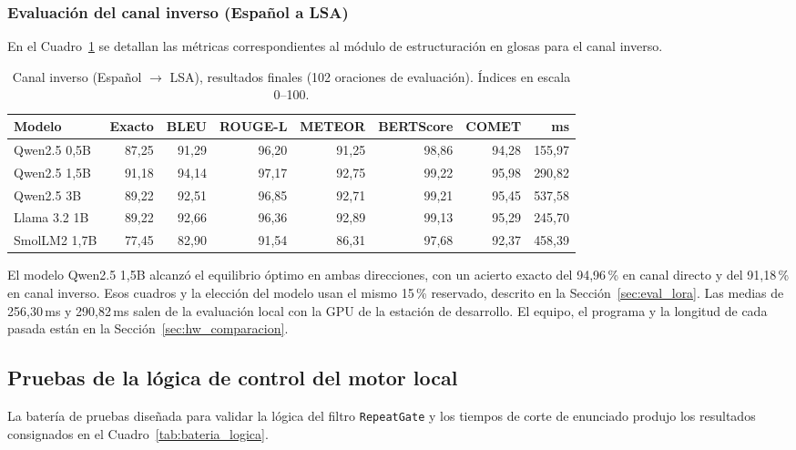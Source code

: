 \subsubsection{Evaluación del canal inverso (Español a LSA)}
En el Cuadro~\ref{tab:sem_inverso} se detallan las métricas correspondientes al módulo de estructuración en glosas para el canal inverso.

\begin{table}[H]
\centering
\footnotesize
\setlength{\tabcolsep}{3.5pt}
\caption{Canal inverso (Español $\rightarrow$ LSA), resultados finales (102 oraciones de evaluación). Índices en escala 0--100.}
\label{tab:sem_inverso}
\begin{tabular}{@{}lrrrrrrr@{}}
\toprule
\textbf{Modelo} & \textbf{Exacto} & \textbf{BLEU} & \textbf{ROUGE-L} & \textbf{METEOR} & \textbf{BERTScore} & \textbf{COMET} & \textbf{ms} \\
\midrule
Qwen2.5 0,5B & 87,25 & 91,29 & 96,20 & 91,25 & 98,86 & 94,28 & 155,97 \\
Qwen2.5 1,5B & 91,18 & 94,14 & 97,17 & 92,75 & 99,22 & 95,98 & 290,82 \\
Qwen2.5 3B   & 89,22 & 92,51 & 96,85 & 92,71 & 99,21 & 95,45 & 537,58 \\
Llama 3.2 1B & 89,22 & 92,66 & 96,36 & 92,89 & 99,13 & 95,29 & 245,70 \\
SmolLM2 1,7B & 77,45 & 82,90 & 91,54 & 86,31 & 97,68 & 92,37 & 458,39 \\
\bottomrule
\end{tabular}
\end{table}

El modelo Qwen2.5 1,5B alcanzó el equilibrio óptimo en ambas direcciones, con un acierto exacto del 94,96\,\% en canal directo y del 91,18\,\% en canal inverso. Esos cuadros y la elección del modelo usan el mismo 15\,\% reservado, descrito en la Sección~\ref{sec:eval_lora}. Las medias de 256,30\,ms y 290,82\,ms salen de la evaluación local con la GPU de la estación de desarrollo. El equipo, el programa y la longitud de cada pasada están en la Sección~\ref{sec:hw_comparacion}.

\subsection{Pruebas de la lógica de control del motor local}
La batería de pruebas diseñada para validar la lógica del filtro \texttt{RepeatGate} y los tiempos de corte de enunciado produjo los resultados consignados en el Cuadro~\ref{tab:bateria_logica}.

